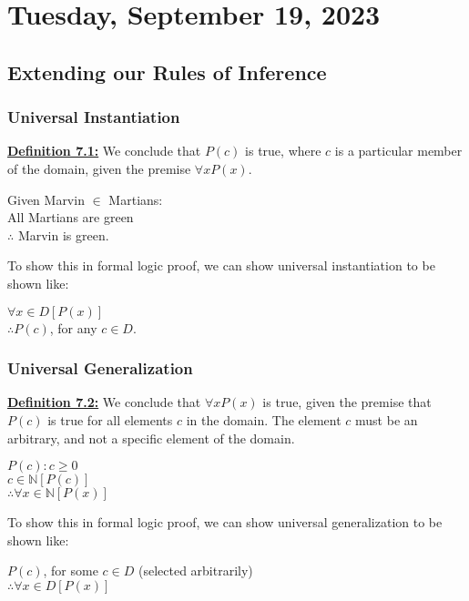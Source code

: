 \section{Tuesday, September 19, 2023}
\subsection{Extending our Rules of Inference}
\subsubsection{Universal Instantiation}
\textbf{\underline{Definition 7.1:}} We conclude that $P(c)$ is true, where \(c\) is a particular member of the domain, given the premise $\forall xP(x)$.

\begin{example}
Given Marvin $\in$ Martians:\\
All Martians are green\\
$\therefore$ Marvin is green.
\end{example}

To show this in formal logic proof, we can show universal instantiation to be shown like:

\begin{center}
    $\forall x \in D[P(x)]$\\
    $\therefore P(c)$, for any $c\in D$.
\end{center}

\subsubsection{Universal Generalization}
\textbf{\underline{Definition 7.2:}} We conclude that $\forall xP(x)$ is true, given the premise that $P(c)$ is true for all elements \(c\) in the domain. The element \(c\) must be an arbitrary, and not a specific element of the domain.

\begin{example}
    $P(c): c \geq 0$\\
    $c \in \mathbb{N}[P(c)]$\\
    $\therefore \forall x \in \mathbb{N}[P(x)]$
\end{example}

To show this in formal logic proof, we can show universal generalization to be shown like:

\begin{center}
    $P(c)$, for some $c \in D$ (selected arbitrarily)\\
    $\therefore \forall x \in D[P(x)]$
\end{center}

